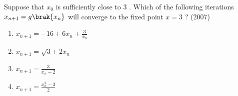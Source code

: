         \item Suppose that $x_{0}$ is sufficiently close to $3$ . Which of the following iterations $x_{n+1}=g\brak{x_{n}}$ will converge to the fixed point $x=3$ ?
        \hfill{(2007)}
            \begin{enumerate}
			\item $x_{n+1}=-16+6 x_{n}+\frac{3}{x_{n}}$
			\item $x_{n+1}=\sqrt{3+2 x_{n}}$
			\item $x_{n+1}=\frac{3}{x_{n}-2}$
			\item $x_{n+1}=\frac{x_{n}^{2}-3}{2}$
        	\end{enumerate}	

